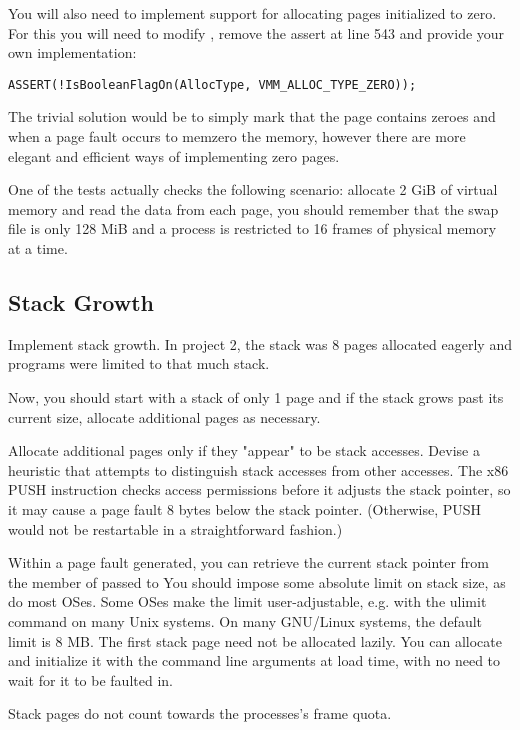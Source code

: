 You will also need to implement support for allocating pages initialized to zero. For this you will
need to modify , remove the assert at line 543 and provide your own
implementation:
\begin{verbatim}
ASSERT(!IsBooleanFlagOn(AllocType, VMM_ALLOC_TYPE_ZERO));
\end{verbatim}

The trivial solution would be to simply mark that the page contains zeroes and when a page fault
occurs to memzero the memory, however there are more elegant and efficient ways of implementing
zero pages.

One of the tests actually checks the following scenario: allocate 2 GiB of virtual memory and read
the data from each page, you should remember that the swap file is only 128 MiB and a process is
restricted to 16 frames of physical memory at a time.

\subsection{Stack Growth}

Implement stack growth. In project 2, the stack was 8 pages allocated eagerly and programs were limited to that much stack.

Now, you should start with a stack of only 1 page and if the stack grows past its current size, allocate additional pages as necessary.

Allocate additional pages only if they "appear" to be stack accesses. Devise a heuristic
that attempts to distinguish stack accesses from other accesses. The x86 PUSH instruction checks access permissions before
it adjusts the stack pointer, so it may cause a page fault 8 bytes below the stack pointer.
(Otherwise, PUSH would not be restartable in a straightforward fashion.)

Within a page fault generated, you can retrieve the current stack pointer
from the  member of  passed to 
You should impose some absolute limit on stack size, as do most OSes.  Some OSes make
the limit user-adjustable, e.g. with the ulimit command on many Unix systems.  On many
GNU/Linux systems, the default limit is 8 MB. The first stack page need not be allocated lazily. You can allocate and initialize it with
the command line arguments at load time, with no need to wait for it to be faulted in.

Stack pages do not count towards the processes's frame quota.

